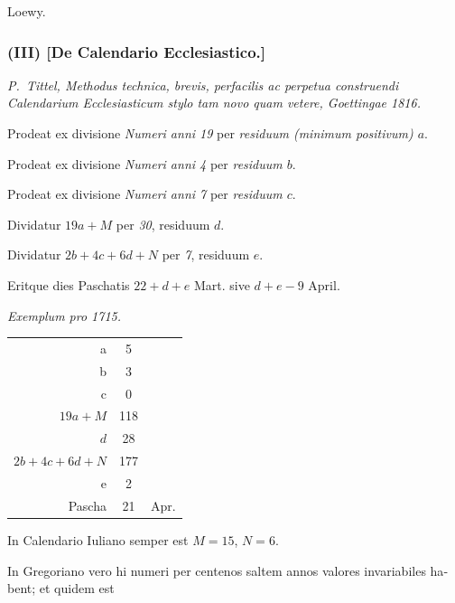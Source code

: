 \documentclass[12pt,a4paper]{article}
\theoremstyle{plain}
\theoremstyle{definition}
\theoremstyle{remark}
\begin{document}
\hfill Loewy.

\newpage

\subsubsection*{(III) [De Calendario Ecclesiastico.]}

\textit{P.~Tittel, Methodus technica, brevis, perfacilis ac perpetua construendi Calendarium Ecclesiasticum stylo tam novo quam vetere, Goettingae 1816.}

\medskip

\begin{otherlanguage}{latin}
Prodeat ex divisione \textit{Numeri anni 19} per \textit{residuum (minimum positivum) $a$}.

Prodeat ex divisione \textit{Numeri anni 4} per \textit{residuum $b$}.

Prodeat ex divisione \textit{Numeri anni 7} per \textit{residuum $c$}.

Dividatur \textit{$19a + M$} per \textit{30}, residuum \textit{$d$}.

Dividatur \textit{$2b + 4c + 6d + N$} per \textit{7}, residuum \textit{$e$}.

Eritque dies Paschatis $22 + d + e$ Mart. sive $d + e - 9$ April.

\medskip

\noindent\textit{Exemplum pro 1715.}
\begin{center}
\begin{tabular}{rcl}
a & 5 & \\
b & 3 & \\
c & 0 & \\
$19a + M$ & 118 & \\
$d$ & 28 & \\
$2b + 4c + 6d + N$ & 177 & \\
e & 2 & \\
Pascha & 21 & Apr.
\end{tabular}
\end{center}

In Calendario Iuliano semper est $M = 15$, $N = 6$.

\medskip

In Gregoriano vero hi numeri per centenos saltem annos valores invariabiles habent; et quidem est


\end{otherlanguage}
\end{document}
